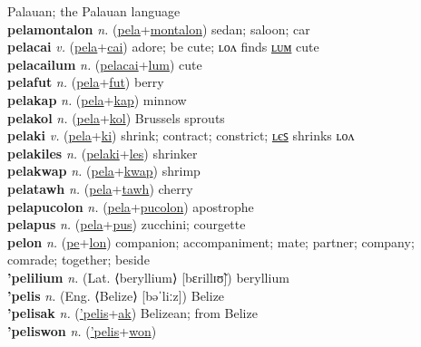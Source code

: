 Palauan; the Palauan language \label{'pelawtilip} \\
\textbf{pelamontalon} \textit{n.} (\hyperref[pela]{pela}+\hyperref[montalon]{montalon})
sedan; saloon; car \label{pelamontalon} \\
\textbf{pelacai} \textit{v.} (\hyperref[pela]{pela}+\hyperref[cai]{cai})
adore; be cute; ʟᴏᴧ finds \hyperref[pelacailum]{ʟᴜᴍ} cute \label{pelacai} \\
\textbf{pelacailum} \textit{n.} (\hyperref[pelacai]{pelacai}+\hyperref[lum]{lum})
cute \label{pelacailum} \\
\textbf{pelafut} \textit{n.} (\hyperref[pela]{pela}+\hyperref[fut]{fut})
berry \label{pelafut} \\
\textbf{pelakap} \textit{n.} (\hyperref[pela]{pela}+\hyperref[kap]{kap})
minnow \label{pelakap} \\
\textbf{pelakol} \textit{n.} (\hyperref[pela]{pela}+\hyperref[kol]{kol})
Brussels sprouts \label{pelakol} \\
\textbf{pelaki} \textit{v.} (\hyperref[pela]{pela}+\hyperref[ki]{ki})
shrink; contract; constrict; \hyperref[pelakiles]{ʟєꜱ} shrinks ʟᴏᴧ \label{pelaki} \\
\textbf{pelakiles} \textit{n.} (\hyperref[pelaki]{pelaki}+\hyperref[les]{les})
shrinker \label{pelakiles} \\
\textbf{pelakwap} \textit{n.} (\hyperref[pela]{pela}+\hyperref[kwap]{kwap})
shrimp \label{pelakwap} \\
\textbf{pelatawh} \textit{n.} (\hyperref[pela]{pela}+\hyperref[tawh]{tawh})
cherry \label{pelatawh} \\
\textbf{pelapucolon} \textit{n.} (\hyperref[pela]{pela}+\hyperref[pucolon]{pucolon})
apostrophe \label{pelapucolon} \\
\textbf{pelapus} \textit{n.} (\hyperref[pela]{pela}+\hyperref[pus]{pus})
zucchini; courgette \label{pelapus} \\
\textbf{pelon} \textit{n.} (\hyperref[pe]{pe}+\hyperref[lon]{lon})
companion; accompaniment; mate; partner; company; comrade; together; beside \label{pelon} \\
\textbf{'pelilium} \textit{n.} (Lat. ⟨beryllium⟩ [bɛrillɪʊ̃])
beryllium \label{'pelilium} \\
\textbf{'pelis} \textit{n.} (Eng. ⟨Belize⟩ [bəˈliːz])
Belize \label{'pelis} \\
\textbf{'pelisak} \textit{n.} (\hyperref['pelis]{'pelis}+\hyperref[ak]{ak})
Belizean; from Belize \label{'pelisak} \\
\textbf{'peliswon} \textit{n.} (\hyperref['pelis]{'pelis}+\hyperref[won]{won})
